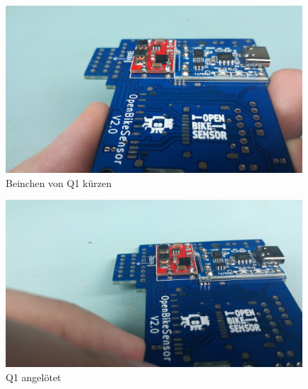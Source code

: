 \documentclass[12pt, a4paper]{article}		%
\begin{document}
\begin{minipage}[t]{0.49\textwidth}
\begin{figure}[H]
	\centering
		\includegraphics[width=0.99\textwidth]{Grafiken/20200726_124729.jpg}
	\caption{Beinchen von Q1 kürzen}
	\label{fig:}
\end{figure}
\end{minipage}
\begin{minipage}[t]{0.49\textwidth}
\begin{figure}[H]
	\centering
		\includegraphics[width=0.99\textwidth]{Grafiken/20200726_124826.jpg}
	\caption{Q1 angelötet}
	\label{fig:}
\end{figure}
\end{minipage}
\end{document}
